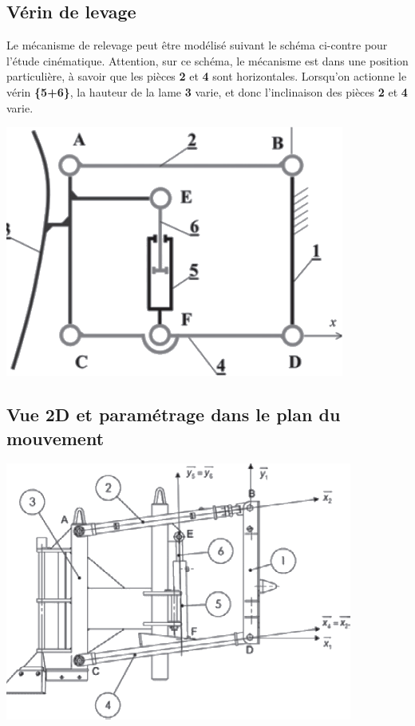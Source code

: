 \documentclass[10pt,fleqn]{article} %
\begin{document}
\begin{multicols}{2}
\subsection*{Vérin de levage}
Le mécanisme de relevage peut être modélisé suivant le schéma ci-contre pour l’étude cinématique. Attention, sur ce schéma, le mécanisme est dans une position particulière, à savoir que les pièces \textbf{2} et \textbf{4} sont horizontales. Lorsqu’on actionne le vérin \textbf{\{5+6\}}, la hauteur de
la lame \textbf{3} varie, et donc l’inclinaison des pièces \textbf{2} et \textbf{4} varie.

\begin{center}
\includegraphics[width=\linewidth]{images/fig_02}
\end{center}

\subsection*{Vue 2D et paramétrage dans le plan du mouvement}


\begin{center}
\includegraphics[width=\linewidth]{images/fig_03}
\end{center}


\end{multicols}
\end{document}
